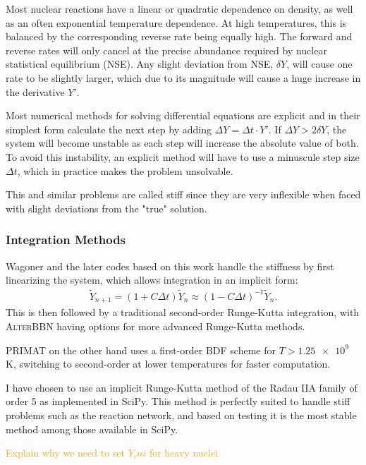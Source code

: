 Most nuclear reactions have a linear or quadratic dependence on density, as well as an often exponential temperature dependence. At high temperatures, this is balanced by the corresponding reverse rate being equally high. The forward and reverse rates will only cancel at the precise abundance required by nuclear statistical equilibrium (NSE). Any slight deviation from NSE, $\delta Y$, will cause one rate to be slightly larger, which due to its magnitude will cause a huge increase in the derivative $Y'$.

Most numerical methods for solving differential equations are explicit and in their simplest form calculate the next step by adding  $\Delta Y = \Delta t \cdot Y' $. 
If $\Delta Y>2\delta Y$, the system will become unstable as each step will increase the absolute value of both. To avoid this instability, an explicit method will have to use a minuscule step size $\Delta t$, which in practice makes the problem unsolvable. 

This and similar problems are called stiff since they are very inflexible when faced with slight deviations from the "true" solution. 


\subsubsection{Integration Methods}

Wagoner and the later codes based on this work handle the stiffness by first linearizing the system, which allows integration in an implicit form:
\begin{align}
    \tilde{Y}_{n+1}=(1+C \Delta t)\tilde{Y}_{n}\approx(1-C \Delta t)^{-1}\tilde{Y}_{n}.
\end{align}
This is then followed by a traditional second-order Runge-Kutta integration, with \textsc{AlterBBN} having options for more advanced Runge-Kutta methods. 

PRIMAT on the other hand uses a first-order BDF scheme for $T>\num{1.25e9}$ K, switching to second-order at lower temperatures for faster computation.

I have chosen to use an implicit Runge-Kutta method of the Radau IIA family of order 5 as implemented in SciPy\cite{SciPy}. This method is perfectly suited to handle stiff problems such as the reaction network, and based on testing it is the most stable method among those available in SciPy.


\textcolor{orange}{Explain why we need to set $Y_ini$ for heavy nuclei}

